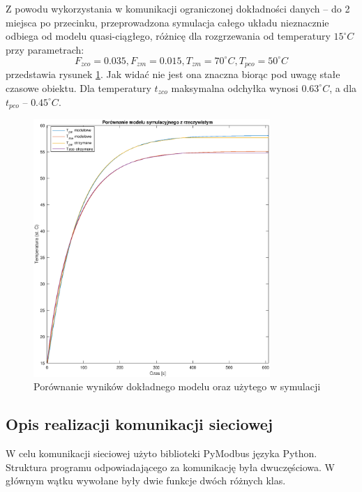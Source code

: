     Z powodu wykorzystania w komunikacji ograniczonej dokładności danych -- do 2 miejsca po przecinku, przeprowadzona symulacja całego układu nieznacznie odbiega od modelu quasi-ciągłego, różnicę dla rozgrzewania od temperatury $15^\circ C$ przy parametrach: 
    $$F_{zco} = 0.035, F_{zm} = 0.015, T_{zm} = 70^\circ C, T_{pco} = 50^\circ C$$
    przedstawia rysunek \ref{Wymiennik_CMP}. Jak widać nie jest ona znaczna biorąc pod uwagę stałe czasowe obiektu. Dla temperatury $t_{zco}$ maksymalna odchyłka wynosi $0.63^\circ C$, a dla $t_{pco}$ -- $0.45^\circ C$.
    \begin{figure}[htb!]
		\centerline{\includegraphics [width=0.8\textwidth,center] {wymiennik_cmp.eps}}
		\caption{Porównanie wyników dokładnego modelu oraz użytego w symulacji}
        \label{Wymiennik_CMP}
	\end{figure}
    
\subsection{Opis realizacji komunikacji sieciowej}    
    W celu komunikacji sieciowej użyto biblioteki PyModbus języka Python.
Struktura programu odpowiadającego za komunikację była dwuczęściowa. W głównym wątku wywołane były dwie funkcje dwóch różnych klas.

